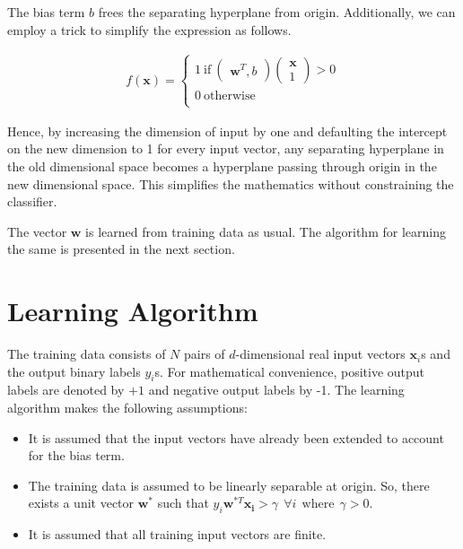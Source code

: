 \documentclass[11pt, a4paper]{article}
\begin{document}
The bias term $b$ frees the separating hyperplane from origin. Additionally, we can employ a trick to simplify the expression as follows.

\begin{align*}
	f(\boldsymbol{x}) = \left\{                                                                    
	\begin{array}{ll}                                                                              
	1\ \text{if}\ \begin{pmatrix} \boldsymbol{w}^T, b \end{pmatrix} \begin{pmatrix} \boldsymbol{x} \\ 
	1 \end{pmatrix} > 0                                                                            \\
	0\ \text{otherwise}                                                                            \\
	\end{array}                                                                                    
	\right.                                                                                        
\end{align*}

Hence, by increasing the dimension of input by one and defaulting the intercept on the new dimension to 1 for every input vector, any separating hyperplane in the old dimensional space 
becomes a hyperplane passing through origin in the new dimensional space. This simplifies the mathematics without constraining the classifier.

The vector $\boldsymbol{w}$ is learned from training data as usual. The algorithm for learning the same is presented in the next section. 

\section{Learning Algorithm}

The training data consists of $N$ pairs of $d$-dimensional real input vectors $\boldsymbol{x}_i$s and the output binary labels $y_i$s. For mathematical convenience, positive output labels are denoted by $+1$ and negative output labels by {-1}. 
The learning algorithm makes the following assumptions:

\begin{itemize}
	\item It is assumed that the input vectors have already been extended to account for the bias term.
	\item The training data is assumed to be linearly separable at origin. So, there exists a unit vector $\boldsymbol{w}^*$ such that $y_i\boldsymbol{w}^{*T}\boldsymbol{x_i} > \gamma \ \ \forall i \ \ \text{where}\ \ \gamma > 0$.
	\item It is assumed that all training input vectors are finite.
\end{itemize} 
\end{document}
